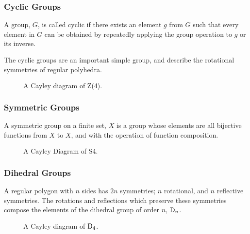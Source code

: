 \subsubsection{Cyclic Groups}
\label{sec:cyclicgroups}

\begin{definition}
  A group, $G$, is called cyclic if there exists an element $g$ from
  $G$ such that every element in $G$ can be obtained by repeatedly
  applying the group operation to $g$ or its inverse.
\end{definition}
The cyclic groups are an important simple group, and describe the
rotational symmetries of regular polyhedra.
\begin{figure}
  \centering
  \caption{A Cayley diagram of Z(4).}
  \label{fig:cayleycyclic}
\end{figure}

\subsubsection{Symmetric Groups}
\label{sec:symmetricgroups}

\begin{definition}
  A symmetric group on a finite set, $X$ is a group whose elements are all bijective functions from $X$ to $X$, and with the operation of function composition.
\end{definition}
\begin{figure}
  \centering
  \caption{A Cayley Diagram of S4.}
  \label{fig:cayleysymmetric}
\end{figure}

\subsubsection{Dihedral Groups}
\label{sec:dihedralgroups}

\begin{definition}
  A regular polygon with $n$ sides has $2n$ symmetries; $n$
  rotational, and $n$ reflective symmetries. The rotations and
  reflections which preserve these symmetries compose the elements of the dihedral group of order $n$, ${\rm D}_n$.
\end{definition}
\begin{figure}
  \centering
  \caption{A Cayley diagram of ${\rm D}_4$.}
  \label{fig:cayleydihedral}
\end{figure}


